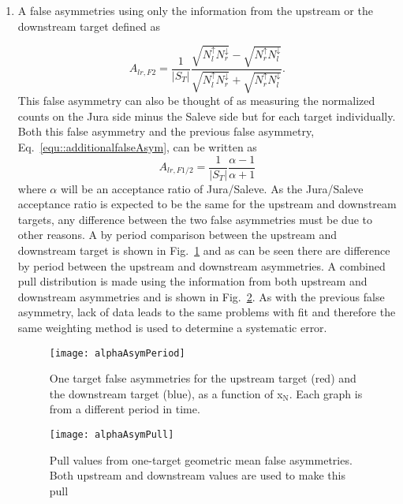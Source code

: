 \begin{enumerate}
\item A false asymmetries using only the information from the upstream or the
  downstream target defined as

  \begin{equation}
    \label{equ::falseANgeomean}
    A_{lr, F2} =
    \frac{1}{|S_T|}
    \frac{\sqrt{N_l^\uparrow N_r^\downarrow}
      - \sqrt{N_r^\uparrow N_l^\downarrow}
    }{
      \sqrt{N_l^\uparrow N_r^\downarrow}
      + \sqrt{N_r^\uparrow N_l^\downarrow}
    }.
  \end{equation}
  This false asymmetry can also be thought of as measuring the normalized counts
  on the Jura side minus the Saleve side but for each target individually.  Both
  this false asymmetry and the previous false asymmetry,
  Eq.~\ref{equ::additionalfalseAsym}, can be written as
  \begin{equation}
    A_{lr,F1/2} =
    \frac{1}{|S_T|}
    \frac{\alpha - 1}{\alpha + 1}
  \end{equation}
  where $\alpha$ will be an acceptance ratio of Jura/Saleve.  As the Jura/Saleve
  acceptance ratio is expected to be the same for the upstream and downstream
  targets, any difference between the two false asymmetries must be due to other
  reasons.  A by period comparison between the upstream and downstream target is
  shown in Fig.~\ref{fig::alphaAsymPeriod} and as can be seen there are
  difference by period between the upstream and downstream asymmetries.  A
  combined pull distribution is made using the information from both upstream
  and downstream asymmetries and is shown in Fig.~\ref{fig::alphaAsymPull}.  As
  with the previous false asymmetry, lack of data leads to the same problems
  with fit and therefore the same weighting method is used to determine a
  systematic error.

  \begin{figure}[h!t]
    \centering \texttt{[image: alphaAsymPeriod]}
    \caption{One target false asymmetries for the upstream target (red) and the
      downstream target (blue), as a function of x$_{\mathrm{N}}$.  Each graph
      is from a different period in time.}
    \label{fig::alphaAsymPeriod}
  \end{figure}

  \begin{figure}[h!t]
    \centering
    \texttt{[image: alphaAsymPull]}
    \caption{Pull values from one-target geometric mean false asymmetries.  Both
      upstream and downstream values are used to make this pull}
    \label{fig::alphaAsymPull}
  \end{figure}


\end{enumerate}
